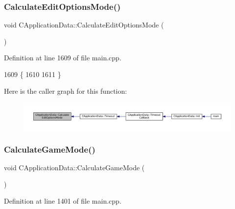 \subsubsection{\texorpdfstring{Calculate\+Edit\+Options\+Mode()}{CalculateEditOptionsMode()}}
{\footnotesize\ttfamily void C\+Application\+Data\+::\+Calculate\+Edit\+Options\+Mode (\begin{DoxyParamCaption}{ }\end{DoxyParamCaption})\hspace{0.3cm}{\ttfamily [protected]}}



Definition at line 1609 of file main.\+cpp.


\begin{DoxyCode}
1609                                                \{
1610 
1611 \}
\end{DoxyCode}
Here is the caller graph for this function\+:
\nopagebreak
\begin{figure}[H]
\begin{center}
\leavevmode
\includegraphics[width=350pt]{classCApplicationData_a9fa1176cd629742424f29ab20c212142_icgraph}
\end{center}
\end{figure}
\hypertarget{classCApplicationData_a782d7204356ef9560deedd54320d4f16}{}\label{classCApplicationData_a782d7204356ef9560deedd54320d4f16} 
\subsubsection{\texorpdfstring{Calculate\+Game\+Mode()}{CalculateGameMode()}}
{\footnotesize\ttfamily void C\+Application\+Data\+::\+Calculate\+Game\+Mode (\begin{DoxyParamCaption}{ }\end{DoxyParamCaption})\hspace{0.3cm}{\ttfamily [protected]}}



Definition at line 1401 of file main.\+cpp.


